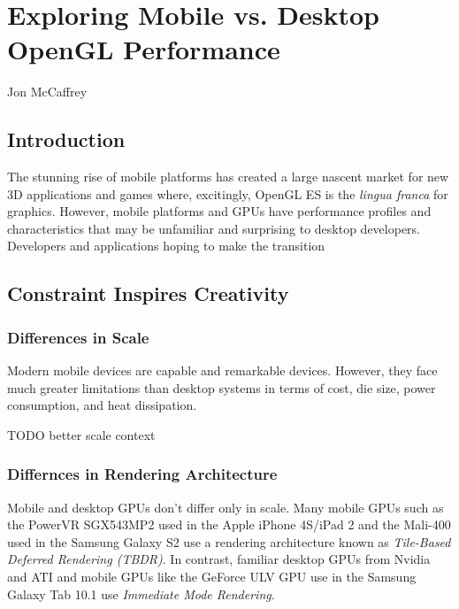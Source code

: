 \chapter{Exploring Mobile vs. Desktop OpenGL Performance}{Jon McCaffrey}
 \label{Exploring-Mobile-vs-Desktop-OpenGL-Performance}

\section{Introduction}

The stunning rise of mobile platforms has created a large nascent market for new 3D applications and games where, excitingly, OpenGL ES is the \textit{lingua franca} for graphics. However, mobile platforms and GPUs have performance profiles and characteristics that may be unfamiliar and surprising to desktop developers.  Developers and applications hoping to make the transition


\section{Constraint Inspires Creativity}\label{YourName:Constraints-Inspire-Creativity}

\subsection{Differences in Scale}\label{Jon-McCaffrey:Architectural-Differences}
Modern mobile devices are capable and remarkable devices.  However, they face much greater limitations than desktop systems in terms of cost, die size, power consumption, and heat dissipation.

TODO better scale context

\subsection{Differnces in Rendering Architecture}\label{Jon-McCaffrey:differences-in-rendering-architecture}

Mobile and desktop GPUs don't differ only in scale.  Many mobile GPUs such as the PowerVR SGX543MP2 used in the Apple iPhone 4S/iPad 2 and the Mali-400 used in the Samsung Galaxy S2 use a rendering architecture known as \textit{Tile-Based Deferred Rendering (TBDR)}.  In contrast, familiar desktop GPUs from Nvidia and ATI and mobile GPUs like the GeForce ULV GPU use in the Samsung Galaxy Tab 10.1 use \textit{Immediate Mode Rendering}.

